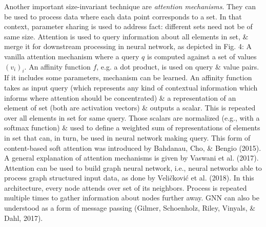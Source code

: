 \documentclass{article}
\begin{document}
\begin{itemize}
\begin{itemize}
\begin{itemize}
            Another important size-invariant technique are {\it attention mechanisms}. They can be used to process data where each data point corresponds to a set. In that context, parameter sharing is used to address fact: different sets need not be of same size. Attention is used to query information about all elements in set, \& merge it for downstream processing in neural network, as depicted in {\sf Fig. 4: A vanilla attention mechanism where a query $q$ is computed against a set of values $(v_i)_i$. An affinity function $f$, e.g. a dot product, is used on query \& value pairs. If it includes some parameters, mechanism can be learned.} An affinity function takes as input query (which represents any kind of contextual information which informs where attention should be concentrated) \& a representation of an element of set (both are activation vectors) \& outputs a scalar. This is repeated over all elements in set for same query. Those scalars are normalized (e.g., with a softmax function) \& used to define a weighted sum of representations of elements in set that can, in turn, be used in neural network making query. This form of content-based soft attention was introduced by Bahdanau, Cho, \& Bengio (2015). A general explanation of attention mechanisms is given by Vaswani et al. (2017). Attention can be used to build graph neural network, i.e., neural networks able to process graph structured input data, as done by Veličković et al. (2018). In this architecture, every node attends over set of its neighbors. Process is repeated multiple times to gather information about nodes further away. GNN can also be understood as a form of message passing (Gilmer, Schoenholz, Riley, Vinyals, \& Dahl, 2017).


\end{itemize}
\end{itemize}
\end{itemize}
\end{document}
